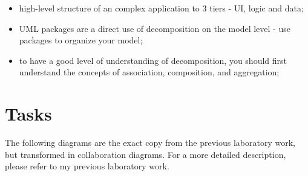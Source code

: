 \documentclass{article}
\begin{document}
\begin{enumerate}
\begin{itemize}
						\item  high-level structure of an complex application to 3 tiers - UI, logic and data;

						\item UML packages are a direct use of decomposition on the model level - use packages to organize your model;

						\item to have a good level of understanding of decomposition, you should first understand the concepts of association, composition, and aggregation;
					\end{itemize}
			\end{enumerate}

	\section{Tasks}
		The following diagrams are the exact copy from the previous laboratory work, but transformed in collaboration diagrams. For a more detailed description, please refer to my previous laboratory work.
\end{document}
